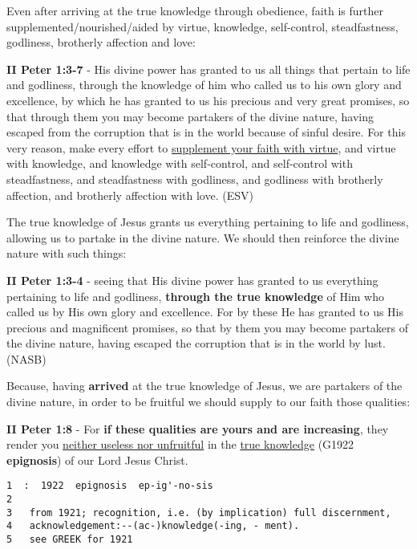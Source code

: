 \documentclass[11pt]{article}
\begin{document}
Even after arriving at the true knowledge through obedience, faith is further supplemented/nourished/aided by virtue, knowledge, self-control, steadfastness, godliness, brotherly affection and love:

\textbf{II Peter 1:3-7} - His divine power has granted to us all things that pertain to life and godliness, through the knowledge of him who called us to his own glory and excellence, by which he has granted to us his precious and very great promises, so that through them you may become partakers of the divine nature, having escaped from the corruption that is in the world because of sinful desire. For this very reason, make every effort to \uline{supplement your faith with virtue}, and virtue with knowledge, and knowledge with self-control, and self-control with steadfastness, and steadfastness with godliness, and godliness with brotherly affection, and brotherly affection with love. (ESV)

The true knowledge of Jesus grants us everything pertaining to life and godliness, allowing us to partake in the divine nature. We should then reinforce the divine nature with such things:

\textbf{II Peter 1:3-4} - seeing that His divine power has granted to us everything pertaining to life and godliness, \textbf{through the true knowledge} of Him who called us by His own glory and excellence. For by these He has granted to us His precious and magnificent promises, so that by them you may become partakers of the divine nature, having escaped the corruption that is in the world by lust. (NASB)

Because, having \textbf{arrived} at the true knowledge of Jesus, we are partakers of the divine nature, in order to be fruitful we should supply to our faith those qualities:

\textbf{II Peter 1:8} - For \textbf{if these qualities are yours and are increasing}, they render you \uline{neither useless nor unfruitful} in the \uline{true knowledge} (G1922 \textbf{epignosis}) of our Lord Jesus Christ.

\begin{verbatim}
1  :  1922  epignosis  ep-ig'-no-sis
2  
3   from 1921; recognition, i.e. (by implication) full discernment,
4   acknowledgement:--(ac-)knowledge(-ing, - ment).
5   see GREEK for 1921
\end{verbatim}
\end{document}

